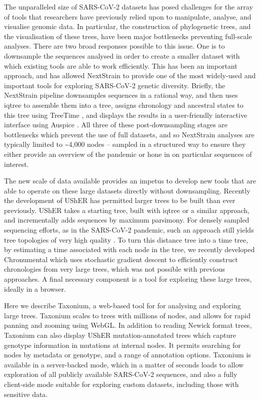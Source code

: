 The unparalleled size of SARS-CoV-2 datasets has posed challenges for the array of tools that researchers have previously relied upon to manipulate, analyse, and visualise genomic data. In particular, the construction of phylogenetic trees, and the visualisation of these trees, have been major bottlenecks preventing full-scale analyses. There are two broad responses possible to this issue. One is to downsample the sequences analysed in order to create a smaller dataset with which existing tools are able to work efficiently. This has been an important approach, and has allowed NextStrain \citep{nextstrain} to provide one of the most widely-used and important tools for exploring SARS-CoV-2 genetic diversity. Briefly, the NextStrain pipeline downsamples sequences in a rational way, and then uses iqtree \citep{iqtree} to assemble them into a tree, assigns chronology and ancestral states to this tree using TreeTime \citep{treetime}, and displays the results in a user-friendly interactive interface using Auspice \citep{nextstrain}. All three of these post-downsampling stages are bottlenecks which prevent the use of full datasets, and so NextStrain analyses are typically limited to \textasciitilde4,000 nodes -- sampled in a structured way to ensure they either provide an overview of the pandemic or hone in on particular sequences of interest.


The new scale of data available provides an impetus to develop new tools that are able to operate on these large datasets directly without downsampling. Recently the development of UShER \citep{usher} has permitted larger trees to be built than ever previously. UShER takes a starting tree, built with iqtree or a similar approach, and incrementally adds sequences by maximum parsimony. For densely sampled sequencing efforts, as in the SARS-CoV-2 pandemic, such an approach still yields tree topologies of very high quality \citep{Thornlow2021.12.02.471004}. To turn this distance tree into a time tree, by estimating a time associated with each node in the tree, we recently developed Chronumental \citep{chronumental} which uses stochastic gradient descent to efficiently construct chronologies from very large trees, which was not possible with previous approaches. A final necessary component is a tool for exploring these large trees, ideally in a browser.

Here we describe Taxonium, a web-based tool for for analysing and exploring large trees. Taxonium scales to trees with millions of nodes, and allows for rapid panning and zooming using WebGL. In addition to reading Newick format trees, Taxonium can also display UShER mutation-annotated trees which capture genotype information in mutations at internal nodes. It permits searching for nodes by metadata or genotype, and a range of annotation options. Taxonium is available in a server-backed mode, which in a matter of seconds loads to allow exploration of all publicly available SARS-CoV-2 sequences, and also a fully client-side mode suitable for exploring custom datasets, including those with sensitive data.


